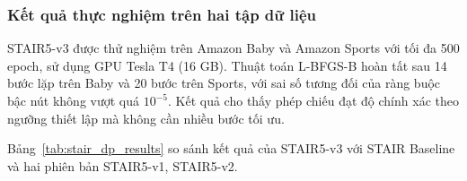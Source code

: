 
\subsubsection{Kết quả thực nghiệm trên hai tập dữ liệu}

STAIR5-v3 được thử nghiệm trên Amazon Baby và Amazon Sports với tối đa 500 epoch, sử dụng GPU Tesla T4 (16 GB). Thuật toán L-BFGS-B hoàn tất sau 14 bước lặp trên Baby và 20 bước trên Sports, với sai số tương đối của ràng buộc bậc nút không vượt quá $10^{-5}$. Kết quả cho thấy phép chiếu đạt độ chính xác theo ngưỡng thiết lập mà không cần nhiều bước tối ưu.

Bảng~\ref{tab:stair_dp_results} so sánh kết quả của STAIR5-v3 với STAIR Baseline và hai phiên bản STAIR5-v1, STAIR5-v2.

\begin{table}[!htbp]
    \centering
    \caption{So sánh kết quả thực nghiệm STAIR5-v3 với Baseline, STAIR5-v1 và STAIR5-v2.}
    \label{tab:stair_dp_results}
    \scriptsize
    \renewcommand{\arraystretch}{1.15}
    \setlength{\tabcolsep}{3pt}

\end{table}

